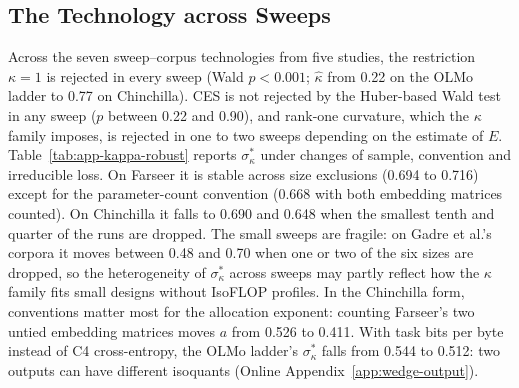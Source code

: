 


\subsection{The Technology across Sweeps}\label{app:add-tech}

Across the seven sweep--corpus technologies from five studies, the restriction $\kappa=1$ is rejected in every sweep
(Wald $p<0.001$; $\hat\kappa$ from 0.22 on the OLMo ladder to 0.77 on Chinchilla). CES is not rejected by the Huber-based
Wald test in any sweep ($p$ between 0.22 and 0.90), and rank-one curvature, which the $\kappa$ family imposes, is rejected
in one to two sweeps depending on the estimate of $E$. Table~\ref{tab:app-kappa-robust} reports $\sigma^*_\kappa$ under
changes of sample, convention and irreducible loss. On Farseer it is stable across size exclusions (0.694 to 0.716) except
for the parameter-count convention (0.668 with both embedding matrices counted). On Chinchilla it falls to 0.690 and 0.648
when the smallest tenth and quarter of the runs are dropped. The small sweeps are fragile: on Gadre et al.'s corpora it moves
between 0.48 and 0.70 when one or two of the six sizes are dropped, so the heterogeneity of $\sigma^*_\kappa$ across sweeps
may partly reflect how the $\kappa$ family fits small designs without IsoFLOP profiles. In the Chinchilla form, conventions
matter most for the allocation exponent: counting Farseer's two untied embedding matrices moves $a$ from 0.526 to 0.411.
With task bits per byte instead of C4 cross-entropy, the OLMo ladder's $\sigma^*_\kappa$ falls from 0.544 to 0.512: two
outputs can have different isoquants (Online Appendix~\ref{app:wedge-output}).


